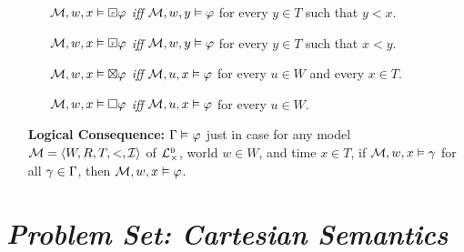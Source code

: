 \documentclass[a4paper, 11pt]{article} %
\begin{document}
\begin{enumerate}[leftmargin=1.2in]
\begin{itemize}[leftmargin=.15in]
      \item[] $\M, w, x \vDash \Past \metaA$ \textit{iff} $\M, w, y\vDash \metaA$ for every $y \in T$ such that $y < x$.
      \item[] $\M, w, x \vDash \Future \metaA$ \textit{iff} $\M, w, y\vDash \metaA$ for every $y \in T$ such that $x < y$.
      \item[] $\M, w, x \vDash \boxtimes \metaA$ \textit{iff} $\M, u, x\vDash \metaA$ for every $u \in W$ and every $x \in T$. %
      \item[] $\M, w, x \vDash \Box \metaA$ \textit{iff} $\M, u, x\vDash \metaA$ for every $u \in W$. %
    \end{itemize}
  \item[\bf Logical Consequence:] $\MetaG \MLmodels[] \metaA$ just in case for any model $\M = \tuple{W, R, T, <, \I}$ of $\BLC$, world $w \in W$, and time $x \in T$, if $\M, w, x \vDash \metaG$ for all $\metaG \in \MetaG$, then $\M, w, x \vDash \metaA$.
\end{enumerate}



\section*{\it Problem Set: Cartesian Semantics}
\end{document}
